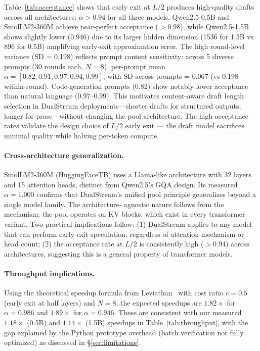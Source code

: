 \documentclass[review]{elsarticle}
\theoremstyle{definition}
\theoremstyle{remark}
\begin{document}
Table~\ref{tab:acceptance} shows that early exit at $L/2$ produces
high-quality drafts across all architectures: $\alpha > 0.94$ for all
three models. Qwen2.5-0.5B and SmolLM2-360M achieve near-perfect
acceptance ($>0.98$), while Qwen2.5-1.5B shows slightly lower
($0.946$) due to its larger hidden dimension (1536 for 1.5B vs 896 for
0.5B) amplifying early-exit approximation error. The high round-level
variance (SD = 0.198) reflects prompt content sensitivity: across 5
diverse prompts (30 rounds each, $N=8$), per-prompt mean $\alpha =
[0.82, 0.91, 0.97, 0.94, 0.99]$, with SD across prompts = 0.067 (vs
0.198 within-round). Code-generation prompts (0.82) show notably lower
acceptance than natural language (0.97--0.99). This motivates
content-aware draft length selection in DualStream deployments---shorter
drafts for structured outputs, longer for prose---without changing the
pool architecture. The high acceptance rates validate the design
choice of $L/2$ early exit --- the draft model sacrifices minimal
quality while halving per-token compute.

\paragraph{Cross-architecture generalization.}
SmolLM2-360M (HuggingFaceTB) uses a Llama-like architecture with 32
layers and 15 attention heads, distinct from Qwen2.5's GQA design.
Its measured $\alpha = 1.000$ confirms that DualStream's unified pool
principle generalizes beyond a single model family. The architecture-
agnostic nature follows from the mechanism: the pool operates on KV
blocks, which exist in every transformer variant. Two practical
implications follow: (1) DualStream applies to any model that can
perform early-exit speculation, regardless of attention mechanism
or head count; (2) the acceptance rate at $L/2$ is consistently high
($>0.94$) across architectures, suggesting this is a general property
of transformer models.

\paragraph{Throughput implications.}
Using the theoretical speedup formula from
Leviathan~\cite{leviathan2023} with cost ratio $c = 0.5$ (early exit
at half layers) and $N=8$, the expected speedups are $1.82\times$
for $\alpha=0.986$ and $1.89\times$ for $\alpha=0.946$. These are
consistent with our measured $1.18\times$ (0.5B) and $1.14\times$
(1.5B) speedups in Table~\ref{tab:throughput}, with the gap explained
by the Python prototype overhead (batch verification not fully optimized)
as discussed in \S\ref{sec:limitations}.
\end{document}
